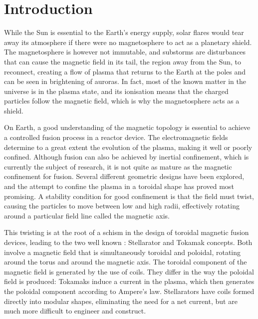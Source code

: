 
\cleardoublepage
\chapter*{Introduction}

While the Sun is essential to the Earth's energy supply, solar flares would tear away its atmosphere if there were no magnetosphere to act as a planetary shield. 
The magnetosphere is however not immutable, and substorms are disturbances that can cause the magnetic field in its tail, the region away from the Sun, to reconnect, creating a flow of plasma that returns to the Earth at the poles and can be seen in brightening of auroras. In fact, most of the known matter in the universe is in the plasma state, and its ionisation means that the charged particles follow the magnetic field, which is why the magnetosphere acts as a shield.

On Earth, a good understanding of the magnetic topology is essential to achieve a controlled fusion process in a reactor device. The electromagnetic fields determine to a great extent the evolution of the plasma, making it well or poorly confined. Although fusion can also be achieved by inertial confinement, which is currently the subject of research, it is not quite as mature as the magnetic confinement for fusion. Several different geometric designs have been explored, and the attempt to confine the plasma in a toroidal shape has proved most promising. A stability condition for good confinement is that the field must twist, causing the particles to move between low and high radii, effectively rotating around a particular field line called the magnetic axis. 

This twisting is at the root of a schism in the design of toroidal magnetic fusion devices, leading to the two well known : Stellarator and Tokamak concepts. Both involve a magnetic field that is simultaneously toroidal and poloidal, rotating around the torus and around the magnetic axis. The toroidal component of the magnetic field is generated by the use of coils. They differ in the way the poloidal field is produced: Tokamaks induce a current in the plasma, which then generates the poloidal component according to Ampere's law. Stellarators have coils formed directly into modular shapes, eliminating the need for a net current, but are much more difficult to engineer and construct.

